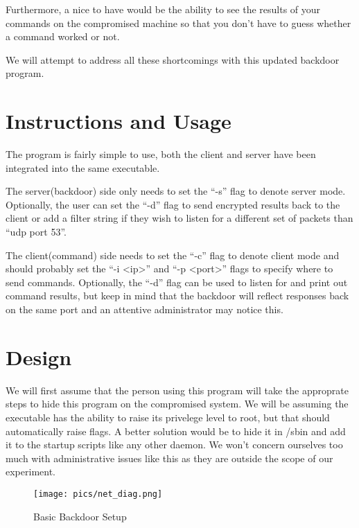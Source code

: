 \documentclass[titlepage]{article}
\begin{document}
Furthermore, a nice to have would be the ability to see the results of
your commands on the compromised machine so that you don't have to guess
whether a command worked or not.

We will attempt to address all these shortcomings with this updated
backdoor program.

\section{Instructions and Usage}

The program is fairly simple to use, both the client and server have
been integrated into the same executable.

The server(backdoor) side only needs to set the ``-s'' flag to denote 
server mode. Optionally, the user can set the ``-d'' flag to send
encrypted results back to the client or add a filter string if they
wish to listen for a different set of packets than ``udp port 53''.

The client(command) side needs to set the ``-c'' flag to denote client
mode and should probably set the ``-i <ip>'' and ``-p <port>'' flags
to specify where to send commands. Optionally, the ``-d'' flag can be
used to listen for and print out command results, but keep in mind that 
the backdoor will reflect responses back on the same port and an
attentive administrator may notice this.

\clearpage

\section{Design}
We will first assume that the person using this program will take the
approprate steps to hide this program on the compromised system. We
will be assuming the executable has the ability to raise its privelege
level to root, but that should automatically
raise flags. A better solution would be to hide it in /sbin and add
it to the startup scripts like any other daemon. We won't concern
ourselves too much with administrative issues like this as they are
outside the scope of our experiment.

\begin{figure}[htb]
  \begin{center}
    \texttt{[image: pics/net\_diag.png]}
  \end{center}
  \caption{Basic Backdoor Setup}
  \label{fig:ntp_packet_image}
\end{figure}
\end{document}
